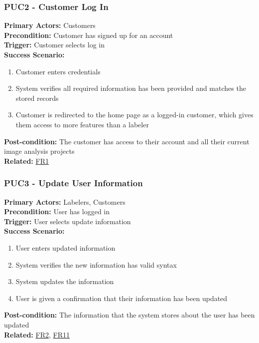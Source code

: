 \documentclass[12pt]{article}
\begin{document}
\subsubsection*{PUC2 - Customer Log In}
\label{sec:PUC2}
\textbf{Primary Actors:} Customers\\ 
\textbf{Precondition:} Customer has signed up for an account\\
\textbf{Trigger:} Customer selects log in\\
\textbf{Success Scenario:}
\begin{enumerate}
    \item Customer enters credentials
    \item System verifies all required information has been provided and matches the stored records
    \item Customer is redirected to the home page as a logged-in customer, which gives them access to more features than a labeler
\end{enumerate}
\textbf{Post-condition:} The customer has access to their account and all their current image analysis projects\\
\textbf{Related:} \hyperref[sec:FR1]{FR1}

\subsubsection*{PUC3 - Update User Information}
\label{sec:PUC3}
\textbf{Primary Actors:} Labelers, Customers\\ 
\textbf{Precondition:} User has logged in\\
\textbf{Trigger:} User selects update information\\
\textbf{Success Scenario:}
\begin{enumerate}
    \item User enters updated information
    \item System verifies the new information has valid syntax
    \item System updates the information
    \item User is given a confirmation that their information has been updated
\end{enumerate}
\textbf{Post-condition:} The information that the system stores about the user has been updated\\
\textbf{Related:} \hyperref[sec:FR2]{FR2}, \hyperref[sec:FR11]{FR11}
\end{document}
